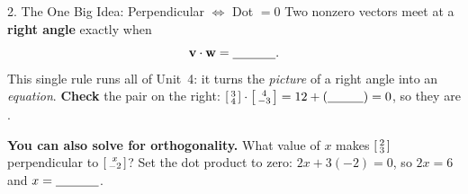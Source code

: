 \documentclass[10pt]{article}
\newcommand{\vv}{\mathbf{v}}
\newcommand{\ww}{\mathbf{w}}
\begin{document}
\begin{notesbox}{2. The One Big Idea: Perpendicular $\Leftrightarrow$ Dot $=0$}
Two nonzero vectors meet at a \textbf{right angle} exactly when
\[
  \vv\cdot\ww = \blank{1.2cm}.
\]
This single rule runs all of Unit~4: it turns the \emph{picture} of a right angle into an
\emph{equation}. \textbf{Check} the pair on the right:
$\begin{bsmallmatrix} 3\\4 \end{bsmallmatrix}\cdot\begin{bsmallmatrix} 4\\-3 \end{bsmallmatrix}
= 12 + (\blank{1.0cm}) = 0$, so they are \blank{2.6cm}.

\begin{center}
\end{center}

\textbf{You can also solve for orthogonality.} What value of $x$ makes
$\begin{bsmallmatrix} 2\\3 \end{bsmallmatrix}$ perpendicular to
$\begin{bsmallmatrix} x\\-2 \end{bsmallmatrix}$? Set the dot product to zero:
$2x + 3(-2) = 0$, so $2x = 6$ and $x = \blank{1.2cm}$.
\end{notesbox}
\end{document}
